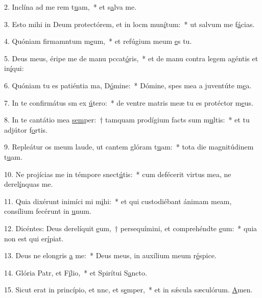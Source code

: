 2. Inclína ad me rem t\uline{u}am,~* et s\uline{a}lva me.\par 
3. Esto mihi in Deum protectórem, et in locm mun\uline{í}tum:~* ut salvum me f\uline{á}cias.\par 
4. Quóniam firmamntum m\uline{e}um,~* et refúgium meum \uline{e}s tu.\par 
5. Deus meus, éripe me de manu pccat\uline{ó}ris,~* et de manu contra legem agéntis et in\uline{í}qui:\par 
6. Quóniam tu es patiéntia ma, D\uline{ó}mine:~* Dómine, spes mea a juventúte m\uline{e}a.\par 
7. In te confirmátus sm ex \uline{ú}tero:~* de ventre matris meæ tu es protéctor m\uline{e}us.\par 
8. In te cantátio mea \uline{sem}per:~† tamquam prodígium facts sum m\uline{u}ltis:~* et tu adjútor f\uline{o}rtis.\par 
9. Repleátur os meum laude, ut cantem glóram t\uline{u}am:~* tota die magnitúdinem t\uline{u}am.\par 
10. Ne projícias me in témpore snect\uline{ú}tis:~* cum defécerit virtus mea, ne derel\uline{í}nquas me.\par 
11. Quia dixérunt inimíci mi m\uline{i}hi:~* et qui custodiébant ánimam meam, consílium fecérunt in \uline{u}num.\par 
12. Dicéntes: Deus derelíquit \uline{e}um,~† persequímini, et comprehéndte \uline{e}um:~* quia non est qui er\uline{í}piat.\par 
13. Deus ne elongris \uline{a} me:~* Deus meus, in auxílium meum r\uline{é}spice.\par 
14. Glória Patr, et F\uline{í}lio,~* et Spirítui S\uline{a}ncto.\par 
15. Sicut erat in princípio, et nnc, et s\uline{e}mper,~* et in sǽcula sæculórum. \uline{A}men.\par 

